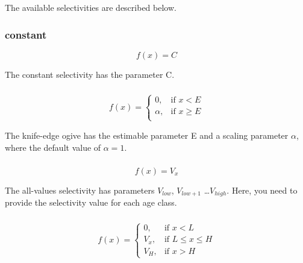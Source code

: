 The available selectivities are described below.

\subsubsection[Constant]{{constant}}

\begin{equation}
f(x)=C
\end{equation}

The constant selectivity has the parameter C. 

\subsubsection[Knife-edge]{}
\begin{equation}
f(x)= \begin{cases}
  0, & \text{if $x < E$} \\
  \alpha, & \text{if $x \ge E$}\\ 
  \end{cases} 
\end{equation}

The knife-edge ogive has the estimable parameter E and a scaling parameter $\alpha$, where the default value of $\alpha = 1$.

\subsubsection[All-values]{}

\begin{equation}
f(x)=V_x
\end{equation}

The all-values selectivity has parameters $V_{low}$, $V_{low+1}$ \ldots $V_{high}$. Here, you need to provide the selectivity value for each age class.

\subsubsection[All-values-bounded]{}

\begin{equation}
f(x)=\begin{cases}
		 0, & \text{if $x < L$} \\
		 V_x, & \text{if $L \le x \le H$} \\
		 V_H, & \text{if $x > H$}
  \end{cases}
\end{equation}

